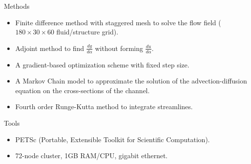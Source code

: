 \documentclass[12pt,t]{beamer}
\begin{document}
\begin{frame}
  Methods
  \begin{itemize}
   \item Finite difference method with staggered mesh to solve the flow field ($180 \times 30 \times 60$ fluid/structure grid).
   \item Adjoint method to find $\frac{dg}{d\alpha}$ without forming $\frac{du}{d\alpha}$.
   \item A gradient-based optimization scheme with fixed step size.
   \item A Markov Chain model to approximate the solution of the advection-diffusion equation on the cross-sections of the channel.
   \item Fourth order Runge-Kutta method to integrate streamlines.
   \end{itemize}
   Tools
   \begin{itemize}
   \item PETSc (Portable, Extensible Toolkit for Scientific Computation).
   \item 72-node cluster, 1GB RAM/CPU, gigabit ethernet.
   \end{itemize}
\end{frame}
\end{document}
